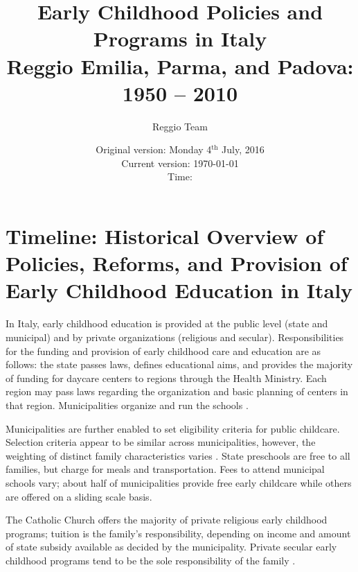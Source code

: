 \documentclass[11pt]{article}
\begin{document}
\title{Early Childhood Policies and Programs in Italy \\ Reggio Emilia, Parma, and Padova: 1950 -- 2010}
\author{Reggio Team}
\date{Original version: Monday 4$^{\text{th}}$ July, 2016 \\ Current version: \today \\ \vspace{1em} Time: \currenttime}
\maketitle

\tableofcontents

\section{Timeline: Historical Overview of Policies, Reforms, and Provision of Early Childhood Education in Italy}

In Italy, early childhood education is provided at the public level (state and municipal) and by private organizations (religious and secular). Responsibilities for the funding and provision of early childhood care and education are as follows: the state passes laws, defines educational aims, and provides the majority of funding for daycare centers to regions through the Health Ministry. Each region may pass laws regarding the organization and basic planning of centers in that region. Municipalities organize and run the schools \citep{Becchi-Ferrari_1990_Pub-Inf-Centres-Italy}. 

Municipalities are further enabled to set eligibility criteria for public childcare. Selection criteria appear to be similar across municipalities, however, the weighting of distinct family characteristics varies \citep{Del-Boca-etal_2016_CESifo-ES}. State preschools are free to all families, but charge for meals and transportation. Fees to attend municipal schools vary; about half of municipalities provide free early childcare while others are offered on a sliding scale basis.

The Catholic Church offers the majority of private religious early childhood programs; tuition is the family's responsibility, depending on income and amount of state subsidy available as decided by the municipality. Private secular early childhood programs tend to be the sole responsibility of the family \citep{Hohnerlein_2009_Paradox-Public-Preschools}.
\end{document}
